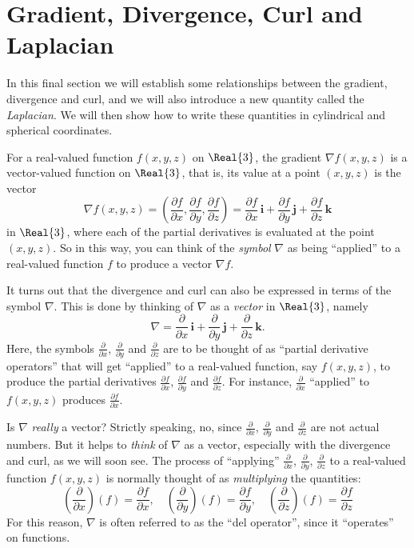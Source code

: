 \section{Gradient, Divergence, Curl and Laplacian}

In this final section we will establish some relationships between the gradient, divergence and curl, and we will also introduce a new quantity called the \emph{Laplacian}. We will then show how to write these quantities in cylindrical and spherical coordinates.

For a real-valued function $f(x,y,z)$ on $\Real{3}$, the gradient $\nabla f(x,y,z)$ is a vector-valued function on $\Real{3}$, that is, its value at a point $(x,y,z)$ is the vector
\[
 \nabla f(x,y,z) = \left( \frac{\partial f}{\partial x},\frac{\partial f}{\partial y},\frac{\partial f}{\partial z}
  \right) =
 \frac{\partial f}{\partial x}\,\textbf{i} + \frac{\partial f}{\partial y}\,\textbf{j} +
 \frac{\partial f}{\partial z}\,\textbf{k}
\]
in $\Real{3}$, where each of the partial derivatives is evaluated at the point $(x,y,z)$. So in this way, you can think of the \emph{symbol} $\nabla$ as being ``applied'' to a real-valued function $f$ to produce a vector $\nabla f$.

It turns out that the divergence and curl can also be expressed in terms of the symbol $\nabla$. This is done by thinking of $\nabla$ as a \emph{vector} in $\Real{3}$, namely\index{$\nabla$}
\begin{equation}\label{eqn:del}
 \nabla = \frac{\partial}{\partial x}\,\textbf{i} + \frac{\partial}{\partial y}\,\textbf{j} +
   \frac{\partial}{\partial z}\,\textbf{k} .
\end{equation}
Here, the symbols $\frac{\partial}{\partial x}$, $ \frac{\partial}{\partial y}$ and $\frac{\partial}{\partial z}$ are to be thought of as ``partial derivative operators'' that will get ``applied'' to a real-valued function, say $f(x,y,z)$, to produce the partial derivatives $\frac{\partial f}{\partial x}$, $\frac{\partial f}{\partial y}$ and $\frac{\partial f}{\partial z}$. For instance, $\frac{\partial}{\partial x}$ ``applied'' to $f(x,y,z)$ produces $\frac{\partial f}{\partial x}$.

Is $\nabla$ \emph{really} a vector? Strictly speaking, no, since $\frac{\partial}{\partial x}$, $\frac{\partial}{\partial y}$ and $\frac{\partial}{\partial z}$ are not actual numbers. But it helps to \emph{think} of $\nabla$ as a vector, especially with the divergence and curl, as we will soon see. The process of ``applying'' $\frac{\partial}{\partial x}$, $\frac{\partial}{\partial y}$, $\frac{\partial}{\partial z}$ to a real-valued function $f(x,y,z)$ is normally thought of as \emph{multiplying} the quantities:
\[
 \left( \frac{\partial}{\partial x} \right) (f) = \frac{\partial f}{\partial x} ,\quad
 \left( \frac{\partial}{\partial y} \right) (f) = \frac{\partial f}{\partial y} ,\quad
 \left( \frac{\partial}{\partial z} \right) (f) = \frac{\partial f}{\partial z}
\]
For this reason, $\nabla$ is often referred to as the ``del operator'', since it ``operates'' on functions.
 
